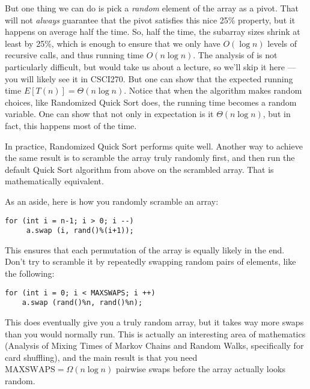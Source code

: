 But one thing we can do is pick a \emph{random} element of the array
as a pivot. That will not \emph{always} guarantee that the pivot
satisfies this nice 25\% property, but it happens on average half the
time. So, half the time, the subarray sizes shrink at least by 25\%,
which is enough to ensure that we only have $O(\log n)$ levels of
recursive calls, and thus running time $O(n \log n)$.
The analysis of  is not particularly
difficult, but would take us about a lecture, so we'll skip it here
--- you will likely see it in CSCI270. But one can show that the
expected running time $E[T(n)] = \Theta(n \log n)$. Notice that when
the algorithm makes random choices, like Randomized Quick Sort does,
the running time becomes a random variable. One can show that not only
in expectation is it $\Theta(n \log n)$, but in fact, this happens
most of the time.

In practice, Randomized Quick Sort performs quite well. Another way to
achieve the same result is to scramble the array truly randomly first,
and then run the default Quick Sort algorithm from above on the
scrambled array. That is mathematically equivalent.

As an aside, here is how you randomly scramble an array:
\begin{verbatim}
for (int i = n-1; i > 0; i --)
     a.swap (i, rand()%(i+1));
\end{verbatim}
This ensures that each permutation of the array is equally likely in
the end. Don't try to scramble it by repeatedly swapping random pairs
of elements, like the following:
\begin{verbatim}
for (int i = 0; i < MAXSWAPS; i ++)
    a.swap (rand()%n, rand()%n);
\end{verbatim}
This does eventually give you a truly random array, but it takes way
more swaps than you would normally run. This is actually an
interesting area of mathematics (Analysis of Mixing Times of Markov
Chains and Random Walks, specifically for card shuffling), and the
main result is that you need $\mbox{MAXSWAPS} = \Omega(n \log n)$
pairwise swaps before the array actually looks random.
